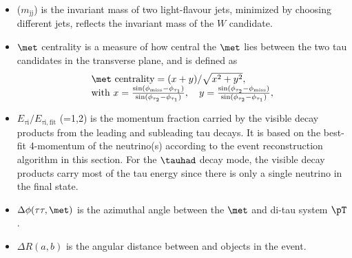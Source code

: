 \begin{itemize}
\item {}($m_{\text{jj}}$) is the invariant mass of two light-flavour jets, minimized by choosing different jets, reflects the invariant mass of the $W$ candidate.
\item $\met$ centrality is a measure of how central the $\met$ lies between the two tau candidates in the transverse plane, and is defined as
\begin{eqnarray}
\begin{array}{l}
\met~\text{centrality} = {(x+y)}/{\sqrt{x^2+y^2}}, \\
\text{with}~x=\frac{\sin(\phi_{\text{miss}}-\phi_{\tau_1})}{\sin(\phi_{\tau_2}-\phi_{\tau_1})}, \quad  y=\frac{\sin(\phi_{\tau_2}-\phi_{\text{miss}})}{\sin(\phi_{\tau_2}-\phi_{\tau_1})} ,
\end{array}
\label{eq:eq3}
\end{eqnarray}
\item $E_{\tau\text{i}}/E_{\tau\text{i},\text{fit}}$ (=1,2) is the momentum fraction carried by the visible decay products from the leading and subleading tau decays. It is based on the best-fit 4-momentum of the neutrino(s) according to the event reconstruction algorithm in this section. For the $\tauhad$ decay mode, the visible decay products carry most of the tau energy since there is only a single neutrino in the final state.%
\item $\Delta\phi(\tau\tau,\met)$ is the azimuthal angle between the $\met$ and di-tau system $\pT$.
\item $\Delta R(a,b)$ is the angular distance between  and  objects in the event. 
\end{itemize}

